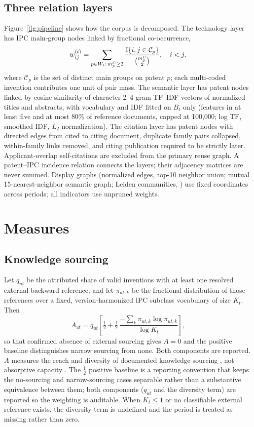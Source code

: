 \subsection{Three relation layers}
Figure~\ref{fig:pipeline} shows how the corpus is decomposed. The technology
layer has IPC main-group nodes linked by fractional co-occurrence,
\begin{equation}
w_{ij}^{(t)}=\sum_{p\in W_t:\,m_p^C\geq2}
\frac{\mathbb{I}\{i,j\in\mathcal{C}_p\}}{\binom{m_p^C}{2}},\quad i<j,
\label{eq:cooc}
\end{equation}
where $\mathcal{C}_p$ is the set of distinct main groups on patent $p$; each
multi-coded invention contributes one unit of pair mass. The semantic layer
has patent nodes linked by cosine similarity of character 2--4-gram TF--IDF
vectors of normalized titles and abstracts, with vocabulary and IDF fitted on
$B_t$ only (features in at least five and at most 80\% of reference documents,
capped at 100{,}000; log TF, smoothed IDF, $L_2$ normalization). The citation
layer has patent nodes with directed edges from cited to citing document,
duplicate family pairs collapsed, within-family links removed, and citing
publication required to be strictly later. Applicant-overlap self-citations are
excluded from the primary reuse graph. A patent--IPC incidence relation
connects the layers; their adjacency matrices are never summed. Display graphs
(normalized edges, top-10 neighbor union; mutual 15-nearest-neighbor semantic
graph; Leiden communities, \citealp{traag2019}) use fixed coordinates across
periods; all indicators use unpruned weights.


\section{Measures}\label{sec:measures}
\subsection{Knowledge sourcing}
Let $q_{ut}$ be the attributed share of valid inventions with at least one
resolved external backward reference, and let $\pi_{ut,k}$ be the fractional
distribution of those references over a fixed, version-harmonized IPC subclass
vocabulary of size $K_t$. Then
\begin{equation}
A_{ut}=q_{ut}\left[\tfrac12+\tfrac12\,
\frac{-\sum_k\pi_{ut,k}\log\pi_{ut,k}}{\log K_t}\right],
\label{eq:acquisition}
\end{equation}
so that confirmed absence of external sourcing gives $A=0$ and the positive
baseline distinguishes narrow sourcing from none. Both components are
reported. $A$ measures the reach and diversity of documented knowledge
sourcing \citep{shannon1948,stirling2007}, not absorptive capacity
\citep{cohen1990}. The $\tfrac12$ positive baseline is a reporting convention
that keeps the no-sourcing and narrow-sourcing cases separable rather than a
substantive equivalence between them; both components ($q_{ut}$ and the
diversity term) are reported so the weighting is auditable. When $K_t\leq1$ or
no classifiable external reference exists, the diversity term is undefined and
the period is treated as missing rather than zero.

